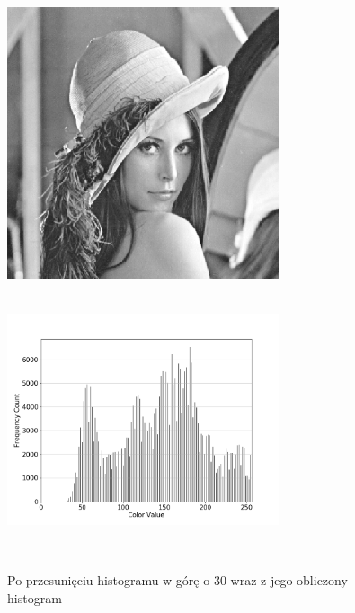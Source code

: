 \documentclass[a4paper,12pt]{book}
\begin{document}
\begin{figure}[H]
	\caption{Po przesunięciu histogramu w górę o 30 wraz z jego obliczony histogram}
	\includegraphics[width=8cm, height=8cm]{5-2/move-histogram-image-lena-30.png}
	\includegraphics[width=8cm, height=8cm]{5-2/move-histogram-lena-30.png}
	

\end{figure}
\end{document}
